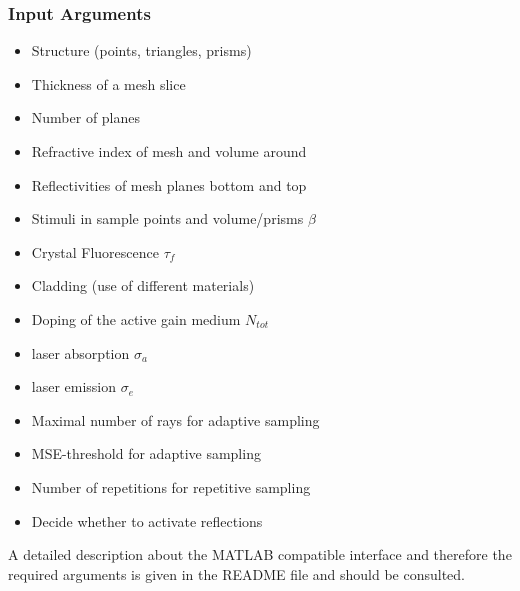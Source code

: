 \subsubsection{Input Arguments}
\begin{description}
  \label{label:input}
  \item[Mesh information]\mbox{}
    \begin{itemize}
      \setlength{\itemindent}{-2.5em}
    \item Structure (points, triangles, prisms)
    \item Thickness of a mesh slice 
    \item Number of planes
    \item Refractive index of mesh and volume around
    \item Reflectivities of mesh planes bottom and top
    \end{itemize}

  \item[Properties]
    \mbox{}
    \begin{itemize}
      \setlength{\itemindent}{-2.5em}
      \item Stimuli in sample points and volume/prisms $\beta$
      \item Crystal Fluorescence $\tau_{f}$
      \item Cladding (use of different materials)
      \item Doping of the active gain medium $N_{tot}$
    \end{itemize}

  \item[Laser information]
    \mbox{}
    \begin{itemize}
      \setlength{\itemindent}{-2.5em}
      \item laser absorption $\sigma_a$
      \item laser emission $\sigma_e$
    \end{itemize}

   \item[Algorithm information]
    \mbox{}
    \begin{itemize}
      \setlength{\itemindent}{-2.5em}
       \item Maximal number of rays for adaptive sampling
       \item MSE-threshold for adaptive sampling
       \item Number of repetitions for repetitive sampling
       \item Decide whether to activate reflections
     \end{itemize}
    
 \end{description}
A detailed description about the MATLAB compatible interface
and therefore the required arguments is given in the README file 
and should be consulted.

